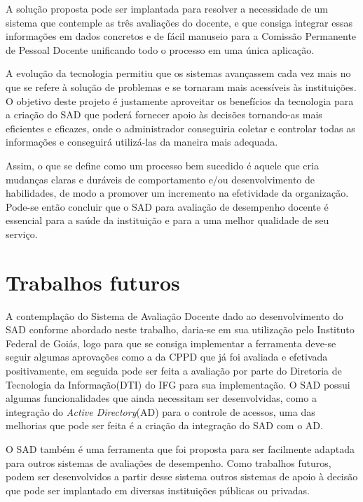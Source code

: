     A solução proposta pode ser implantada para resolver a necessidade de um sistema que contemple as três avaliações do docente, e que consiga integrar essas informações em dados concretos e de fácil manuseio para a Comissão Permanente de Pessoal Docente unificando todo o processo em uma única aplicação.

    A evolução da tecnologia permitiu que os sistemas avançassem cada vez mais no que se refere à solução de problemas e se tornaram mais acessíveis às instituições. O objetivo deste projeto é justamente aproveitar os benefícios da tecnologia para a criação do SAD que poderá fornecer apoio às decisões tornando-as mais eficientes e eficazes, onde o administrador conseguiria coletar e controlar todas as informações e conseguirá utilizá-las da maneira mais adequada. 

    Assim, o que se define como um processo bem sucedido é aquele que cria mudanças claras e duráveis de comportamento e/ou desenvolvimento de habilidades, de modo a promover um incremento na efetividade da organização. Pode-se então concluir que o SAD para avaliação de desempenho docente é essencial para a saúde da instituição e para a uma melhor qualidade de seu serviço. 
    
    
\section{Trabalhos futuros}  
    A contemplação do Sistema de Avaliação Docente dado ao desenvolvimento do SAD conforme abordado neste trabalho, daria-se em sua utilização pelo Instituto Federal de Goiás, logo para que se consiga implementar a ferramenta deve-se seguir algumas aprovações como a da CPPD que já foi avaliada e efetivada positivamente, em seguida pode ser feita a avaliação por parte do Diretoria de Tecnologia da Informação(DTI) do IFG para sua implementação. O SAD possui algumas funcionalidades que ainda necessitam ser desenvolvidas, como a integração do \textit{Active Directory}(AD) para o controle de acessos, uma das melhorias que pode ser feita é a criação da integração do SAD com o AD.

    O SAD também é uma ferramenta que foi proposta para ser facilmente adaptada para outros sistemas de avaliações de desempenho. Como trabalhos futuros, podem ser desenvolvidos a partir desse sistema outros sistemas de apoio à decisão que pode ser implantado em diversas instituições públicas ou privadas.
    


